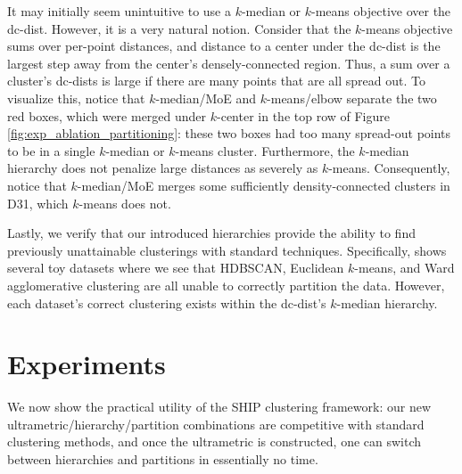 It may initially seem unintuitive to use a $k$-median or $k$-means objective over the dc-dist. However, it is a very natural notion. Consider that the $k$-means objective sums over per-point distances, and distance to a center under the dc-dist is the largest step away from the center's densely-connected region. Thus, a sum over a cluster's dc-dists is large if there are many points that are all spread out. To visualize this, notice that $k$-median/MoE and $k$-means/elbow separate the two red boxes, which were merged under $k$-center in the top row of Figure \ref{fig:exp_ablation_partitioning}: these two boxes had too many spread-out points to be in a single $k$-median or $k$-means cluster. Furthermore, the $k$-median hierarchy does not penalize large distances as severely as $k$-means. Consequently, notice that $k$-median/MoE merges some sufficiently density-connected clusters in D31, which $k$-means does not.


Lastly, we verify that our introduced hierarchies provide the ability to find previously unattainable clusterings with standard techniques. Specifically,  shows several toy datasets where we see that HDBSCAN, Euclidean $k$-means, and Ward agglomerative clustering are all unable to correctly partition the data. However, each dataset's correct clustering exists within the dc-dist's $k$-median hierarchy.


\section{Experiments}\label{sec:experiments}

\begin{table*}[thb]
    \centering
    \caption{
    ARI values indicate that our framework achieves high clustering quality with an automated selection of $k$, matching even competitors' performance that relies on the GT number of clusters ($k$-means, SCAR, Ward).
    (Full version: Table \ref{tbl:ari_full} in the Appendix.) %
    }
    \label{tbl:experiments_ari}
    \vspace{0.5em}
    
\end{table*}

We now show the practical utility of the SHIP clustering framework: our new ultrametric/hierarchy/partition combinations are competitive with standard clustering methods, and once the ultrametric is constructed, one can switch between hierarchies and partitions in essentially no time.

